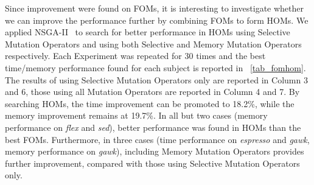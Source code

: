 \documentclass[oribibl]{llncs}
\begin{document}
Since improvement were found on FOMs, it is interesting to investigate whether we can improve the performance further by combining FOMs to form HOMs.
We applied NSGA-II~\cite{996017} to search for better performance in HOMs using Selective Mutation Operators and using both Selective and Memory Mutation Operators respectively.
Each Experiment was repeated for 30 times and the best time/memory performance found for each subject is reported in \tablename~\ref{tab_fomhom}.
The results of using Selective Mutation Operators only are reported in Column 3 and 6, those using all Mutation Operators are reported in Column 4 and 7.
By searching HOMs, the time improvement can be promoted to 18.2\%, while the memory improvement remains at 19.7\%.
In all but two cases (memory performance on \emph{flex} and \emph{sed}), better performance was found in HOMs than the best FOMs.
Furthermore, in three cases (time performance on \emph{espresso} and \emph{gawk}, memory performance on \emph{gawk}), including Memory Mutation Operators provides further improvement, compared with those using Selective Mutation Operators only.
\end{document}
